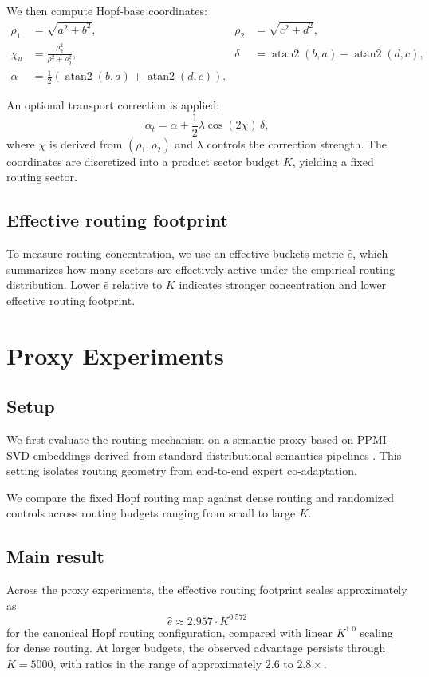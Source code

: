\documentclass[10pt,twocolumn]{article}
\begin{document}
We then compute Hopf-base coordinates:
\begin{align}
\rho_1 &= \sqrt{a^2+b^2}, & \rho_2 &= \sqrt{c^2+d^2}, \\
\chi_u &= \frac{\rho_2^2}{\rho_1^2+\rho_2^2}, &
\delta &= \operatorname{atan2}(b,a)-\operatorname{atan2}(d,c), \\
\alpha &= \tfrac{1}{2}\left(\operatorname{atan2}(b,a)+\operatorname{atan2}(d,c)\right).
\end{align}

An optional transport correction is applied:
\[
\alpha_t = \alpha + \frac{1}{2}\lambda \cos(2\chi)\,\delta,
\]
where $\chi$ is derived from $(\rho_1,\rho_2)$ and $\lambda$ controls the correction strength. The coordinates are discretized into a product sector budget $K$, yielding a fixed routing sector.

\subsection{Effective routing footprint}
To measure routing concentration, we use an effective-buckets metric $\hat e$, which summarizes how many sectors are effectively active under the empirical routing distribution. Lower $\hat e$ relative to $K$ indicates stronger concentration and lower effective routing footprint.

\section{Proxy Experiments}
\subsection{Setup}
We first evaluate the routing mechanism on a semantic proxy based on PPMI-SVD embeddings derived from standard distributional semantics pipelines \citep{mikolov2013word2vec,pennington2014glove}. This setting isolates routing geometry from end-to-end expert co-adaptation.

We compare the fixed Hopf routing map against dense routing and randomized controls across routing budgets ranging from small to large $K$.

\subsection{Main result}
Across the proxy experiments, the effective routing footprint scales approximately as
\[
\hat e \approx 2.957 \cdot K^{0.572}
\]
for the canonical Hopf routing configuration, compared with linear $K^{1.0}$ scaling for dense routing. At larger budgets, the observed advantage persists through $K=5000$, with ratios in the range of approximately $2.6$ to $2.8\times$.
\end{document}
